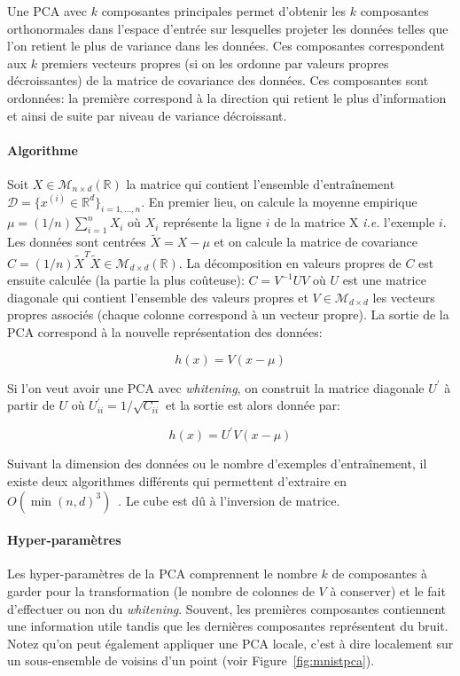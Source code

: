 Une PCA avec $k$ composantes principales permet d'obtenir les $k$ composantes
orthonormales dans l'espace d'entrée sur lesquelles projeter les données telles
que l'on retient le plus de variance dans les données. Ces composantes
correspondent aux $k$ premiers vecteurs propres (si on les ordonne par valeurs
propres décroissantes) de la matrice de covariance des données.  Ces
composantes sont ordonnées: la première correspond à la direction qui retient
le plus d'information et ainsi de suite par niveau de variance décroissant.

\paragraph{Algorithme} Soit $X\in\mathcal{M}_{n\times d}(\mathbb{R})$ la
matrice qui contient l'ensemble d'entraînement $\mathcal{D}=\lbrace
x^{(i)}\in\mathbb{R}^d \rbrace_{i=1,\dots,n}$.  En premier lieu, on calcule la
moyenne empirique $\mu=(1/n)\sum_{i=1}^{n}X_i$ où $X_i$ représente la ligne $i$
de la matrice X \textit{i.e.} l'exemple $i$. Les données sont centrées
$\tilde{X}=X-\mu$ et on calcule la matrice de covariance
$C=(1/n)\tilde{X}^T\tilde{X}\in\mathcal{M}_{d\times d}(\mathbb{R})$. La décomposition en valeurs propres de $C$ est
ensuite calculée (la partie la plus co\^uteuse): $C=V^{-1}UV$ où
$U$ est une matrice diagonale qui contient l'ensemble des valeurs propres
et $V\in\mathcal{M}_{d\times d}$ les vecteurs propres associés (chaque colonne
correspond à un vecteur propre). La sortie de la PCA correspond à la nouvelle représentation des données:

\begin{equation}
h(x)=V(x-\mu)
\end{equation}

Si l'on veut avoir une PCA avec \textit{whitening}, on construit la matrice
diagonale $U^{'}$ à partir de $U$ où $U^{'}_{ii}=1/\sqrt{C_{ii}}$ et la sortie
est alors donnée par:

\begin{equation}
h(x)=U^{'}V(x-\mu)
\end{equation}


Suivant la dimension des données ou le nombre d'exemples d'entraînement, il
existe deux algorithmes différents qui permettent d'extraire en
$O(\min(n,d)^3)$~\citep{bishop-book2006}.  Le cube est dû à l'inversion de
matrice.

\paragraph{Hyper-paramètres} Les hyper-paramètres de la PCA comprennent le
nombre $k$ de composantes à garder pour la transformation (le nombre de
colonnes de $V$ à conserver) et le fait d'effectuer ou non du
\textit{whitening}. Souvent, les premières composantes contiennent une
information utile tandis que les dernières composantes représentent du bruit.
Notez qu'on peut également appliquer une PCA locale, c'est à dire localement
sur un sous-ensemble de voisins d'un point (voir Figure~\ref{fig:mnistpca}).


